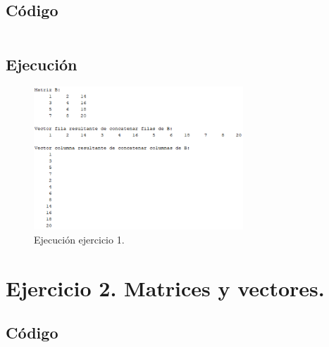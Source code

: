 \documentclass[a4paper, 12pt]{article}
\begin{document}
	\subsection{Código}
	\inputminted[fontsize=\scriptsize, linenos, breaklines=true, xleftmargin=0.75cm, frame=lines]{matlab}{code/parte1/Ejercicio1.m}
	\subsection{Ejecución}
	\begin{figure}[htp!]
		\centering
		\includegraphics[width=0.7\textwidth]{figures/ejc1.png}
		\caption{Ejecución ejercicio 1.}
	\end{figure}
	
	\section{Ejercicio 2. Matrices y vectores.}
	
	\subsection{Código}
	\inputminted[fontsize=\scriptsize, linenos, breaklines=true, xleftmargin=0.75cm, frame=lines]{matlab}{code/parte1/Ejercicio2.m}
\end{document}
